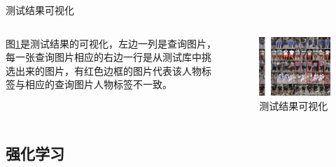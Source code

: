     \begin{frame}{测试结果可视化}
        \begin{columns}
            \begin{column}{0.5\textwidth}
                图\ref{fig:testvis}是测试结果的可视化，左边一列是查询图片，每一张查询图片相应的右边一行是从测试库中挑选出来的图片，有红色边框的图片代表该人物标签与相应的查询图片人物标签不一致。
            \end{column}
            \begin{column}{0.5\textwidth}
                \begin{figure}
                \centering
                \includegraphics[width=\textwidth]{figures/vis3}
                \caption{测试结果可视化}
                \label{fig:testvis}
                \end{figure}
            \end{column}
        \end{columns}
    \end{frame}

\subsection{强化学习}

